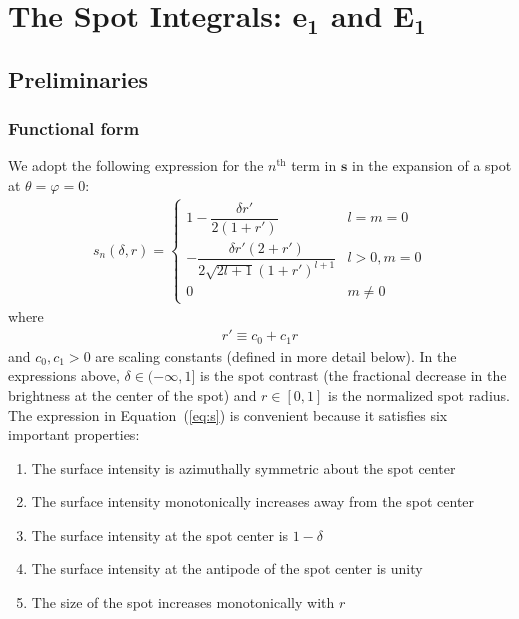 \documentclass[modern]{aastex62}
\begin{document}
%
\section{The Spot Integrals: \lowercase{$\mathbf{e_1}$} and $\mathbf{E_1}$}
\label{sec:spot}
%
\subsection{Preliminaries}
%
\subsubsection{Functional form}
\label{sec:spot-function}
%
We adopt the following expression for the $n^{\mathrm{th}}$ term in $\mathbf{s}$
in the expansion of a spot at
$\theta = \varphi = 0$:
%
\begin{align}
    \label{eq:s}
    s_{n}(\delta, r) =
    \begin{cases}
        1 - \dfrac{\delta r'}{2 (1 + r')}
         & l = m = 0    \\[2em]
        -\dfrac{\delta r' \left( 2 + r' \right)}
        {2 \sqrt{2l + 1} (1 + r')^{l + 1}}
         & l > 0, m = 0 \\[2em]
        0
         & m \ne 0
    \end{cases}
\end{align}
%
where
%
\begin{align}
    \label{eq:rprime}
    r' \equiv c_0 + c_1 r
\end{align}
%
and $c_0, c_1 > 0$ are scaling constants (defined in more detail below).
In the expressions above,
$\delta \in (-\infty, 1]$ is the spot contrast (the fractional
decrease in the brightness
at the center of the spot) and $r \in [0, 1]$ is the normalized spot radius.
The expression in Equation~(\ref{eq:s}) is convenient because it satisfies
six important properties:
%
\begin{enumerate}[itemsep=2pt,parsep=1pt,label=\textbf{\arabic*}]
    \item The surface intensity is azimuthally symmetric about the spot center
    \item The surface intensity monotonically increases away from the spot center
    \item The surface intensity at the spot center is $1 - \delta$
    \item The surface intensity at the antipode of the spot center is unity
    \item The size of the spot increases monotonically with $r$
\end{enumerate}
\end{document}
